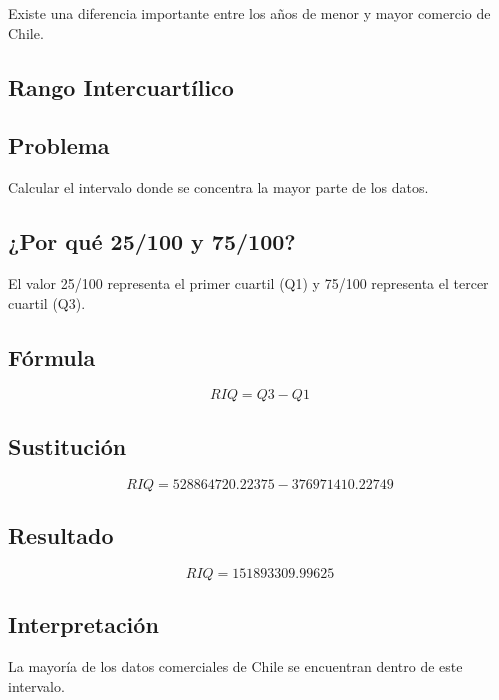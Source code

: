 \documentclass[12pt]{article}
\begin{document}
Existe una diferencia importante entre los años de menor y mayor comercio de Chile.


\subsection{Rango Intercuartílico}

\subsection*{Problema}

Calcular el intervalo donde se concentra la mayor parte de los datos.

\subsection*{¿Por qué 25/100 y 75/100?}

El valor 25/100 representa el primer cuartil (Q1) y 75/100 representa el tercer cuartil (Q3).

\subsection*{Fórmula}

\[
RIQ = Q3 - Q1
\]

\subsection*{Sustitución}

\[
RIQ = 528864720.22375 - 376971410.22749
\]

\subsection*{Resultado}

\[
RIQ = 151893309.99625
\]

\subsection*{Interpretación}

La mayoría de los datos comerciales de Chile se encuentran dentro de este intervalo.

\end{document}
